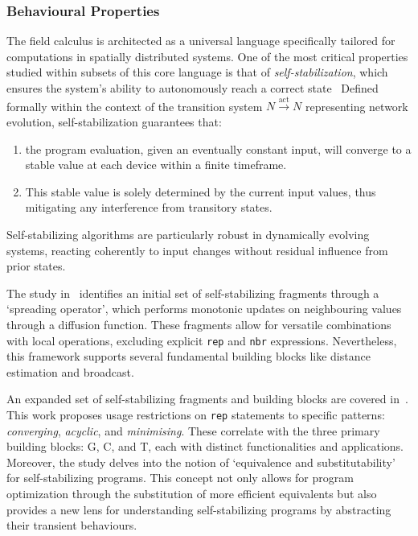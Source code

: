 \subsubsection{Behavioural Properties}\label{sec:field-calculus-behavioural-properties}
The field calculus is architected as a universal language specifically tailored for computations in spatially distributed systems. 
 One of the most critical properties studied within subsets of this core language is that of \emph{self-stabilization}, 
 which ensures the system's ability to autonomously reach a correct state~\cite{lafuente2015fixpoint}%
 Defined formally within the context of the transition system \( N \stackrel{\text{act}}{\rightarrow} N \) representing network evolution, self-stabilization guarantees that:
\begin{enumerate}
    \item the program evaluation, given an eventually constant input, 
    will converge to a stable value at each device within a finite timeframe.
    \item This stable value is solely determined by the current input values, 
    thus mitigating any interference from transitory states.
\end{enumerate}

Self-stabilizing algorithms are particularly robust in dynamically evolving systems, 
 reacting coherently to input changes without residual influence from prior states.

The study in~\cite{damiani2015type}
 identifies an initial set of self-stabilizing fragments through a `spreading operator', 
 which performs monotonic updates on neighbouring values through a diffusion function. 
 These fragments allow for versatile combinations with local operations, 
 excluding explicit \texttt{rep} and \texttt{nbr} expressions. 
 Nevertheless, this framework supports several fundamental building blocks like distance estimation and broadcast.

An expanded set of self-stabilizing fragments and building blocks are covered in~\cite{viroli2018engineering}. 
 This work proposes usage restrictions on \texttt{rep} statements to specific patterns: 
 \emph{converging}, \emph{acyclic}, and \emph{minimising}. 
 These correlate with the three primary building blocks: 
 G, C, and T, each with distinct functionalities and applications. 
 Moreover, the study delves into the notion of `equivalence and substitutability' for self-stabilizing programs. 
 This concept not only allows for program optimization through the substitution of more efficient equivalents but also provides a new lens for understanding self-stabilizing programs by abstracting their transient behaviours.

